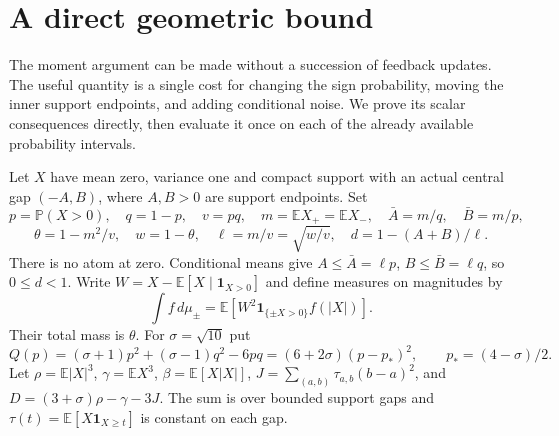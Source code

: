 \section{A direct geometric bound}
\label{v10:geometry}
The moment argument can be made without a succession of feedback updates.
The useful quantity is a single cost for changing the sign probability,
moving the inner support endpoints, and adding conditional noise. We prove
its scalar consequences directly, then evaluate it once on each of the
already available probability intervals.

Let $X$ have mean zero, variance one and compact support with an actual
central gap $(-A,B)$, where $A,B>0$ are support endpoints. Set
\[
 p=\mathbb P(X>0),\quad q=1-p,\quad v=pq,\quad
 m=\mathbb EX_+=\mathbb EX_-,\quad \bar A=m/q,\quad\bar B=m/p,
\]
\[
 \theta=1-m^2/v,\quad w=1-\theta,\quad
 \ell=m/v=\sqrt{w/v},\quad d=1-(A+B)/\ell.
\]
There is no atom at zero. Conditional means give $A\le\bar A=\ell p$,
$B\le\bar B=\ell q$, so $0\le d<1$. Write
$W=X-\mathbb E[X\mid\mathbf1_{X>0}]$ and define measures on magnitudes by
\[
 \int f\,d\mu_\pm=\mathbb E[W^2\mathbf1_{\{\pm X>0\}}f(|X|)].
\]
Their total mass is $\theta$. For $\sigma=\sqrt{10}$ put
\[
 Q(p)=(\sigma+1)p^2+(\sigma-1)q^2-6pq
      =(6+2\sigma)(p-p_*)^2,\qquad p_*=(4-\sigma)/2.
\]
Let $\rho=\mathbb E|X|^3$, $\gamma=\mathbb EX^3$,
$\beta=\mathbb E[X|X|]$,
$J=\sum_{(a,b)}\tau_{a,b}(b-a)^2$, and
$D=(3+\sigma)\rho-\gamma-3J$. The sum is over bounded support gaps and
$\tau(t)=\mathbb E[X\mathbf1_{X\ge t}]$ is constant on each gap.

